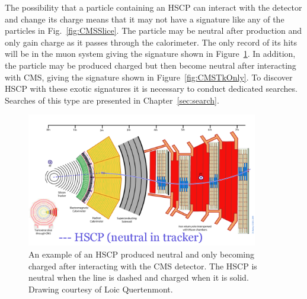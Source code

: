 The possibility that a particle containing an HSCP can interact with the detector and change its charge
means that it may not have a signature like any of the particles in Fig.~\ref{fig:CMSSlice}. The particle
may be neutral after production and only gain charge as it passes through the calorimeter. The only record of its hits will be in the muon system giving the signature shown in
Figure~\ref{fig:CMSMuOnly}. In addition, the particle may be produced charged but then become neutral after interacting with CMS, giving the signature shown in
Figure~\ref{fig:CMSTkOnly}. To discover HSCP with these exotic signatures it is necessary to conduct dedicated searches.
Searches of this type are presented in Chapter~\ref{sec:search}.



\begin{figure}
  \begin{center}
      \includegraphics[clip=true, trim=0.0cm 0cm 3.0cm 0cm, width=0.9\textwidth]{figures/apparatus/ParticleInCMS_0009_Becoming_Charged}
      \caption[An example of an HSCP produced neutral and only becoming charged after interacting with the CMS detector.]
        {An example of an HSCP produced neutral and only becoming charged after interacting with the CMS detector. The HSCP is neutral when the line is dashed
and charged when it is solid. Drawing courtesy of Loic Quertenmont.
	 }
      \label{fig:CMSMuOnly}
  \end{center}
\end{figure}

